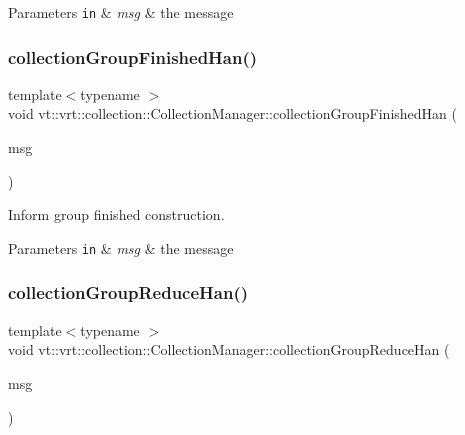 \begin{DoxyParams}[1]{Parameters}
\mbox{\tt in}  & {\em msg} & the message \\
\hline
\end{DoxyParams}
\mbox{\label{structvt_1_1vrt_1_1collection_1_1_collection_manager_abf80612ba1db9aadf590f837ae4ca7a7}} 
\subsubsection{\texorpdfstring{collection\+Group\+Finished\+Han()}{collectionGroupFinishedHan()}}
{\footnotesize\ttfamily template$<$typename $>$ \\
void vt\+::vrt\+::collection\+::\+Collection\+Manager\+::collection\+Group\+Finished\+Han (\begin{DoxyParamCaption}\item[{\hyperlink{structvt_1_1vrt_1_1collection_1_1_collection_group_msg}{Collection\+Group\+Msg} $\ast$}]{msg }\end{DoxyParamCaption})\hspace{0.3cm}{\ttfamily [static]}}



Inform group finished construction. 


\begin{DoxyParams}[1]{Parameters}
\mbox{\tt in}  & {\em msg} & the message \\
\hline
\end{DoxyParams}
\mbox{\label{structvt_1_1vrt_1_1collection_1_1_collection_manager_acf097bb149749c5e8e93d31b84d5a2a3}} 
\subsubsection{\texorpdfstring{collection\+Group\+Reduce\+Han()}{collectionGroupReduceHan()}}
{\footnotesize\ttfamily template$<$typename $>$ \\
void vt\+::vrt\+::collection\+::\+Collection\+Manager\+::collection\+Group\+Reduce\+Han (\begin{DoxyParamCaption}\item[{\hyperlink{structvt_1_1vrt_1_1collection_1_1_collection_group_msg}{Collection\+Group\+Msg} $\ast$}]{msg }\end{DoxyParamCaption})\hspace{0.3cm}{\ttfamily [static]}}



